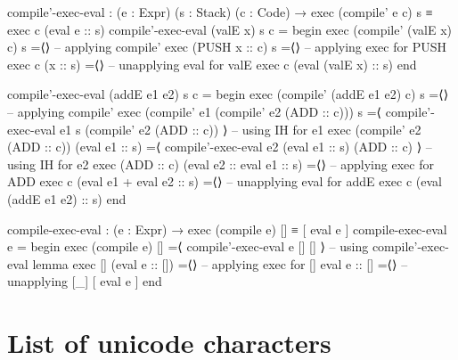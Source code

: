 \documentclass[a4paper,UKenglish]{tufte-handout}
\theoremstyle{definition}
\begin{document}
\begin{AgdaAlign}
\begin{AgdaSuppressSpace}
\begin{fullwidth}
\begin{code}[number]
compile'-exec-eval : (e : Expr) (s : Stack) (c : Code)
  → exec (compile' e c) s ≡ exec c (eval e :: s)
compile'-exec-eval (valE x) s c =
  begin
    exec (compile' (valE x) c) s
  =⟨⟩                                                    -- applying compile'
    exec (PUSH x :: c) s
  =⟨⟩                                                    -- applying exec for PUSH
    exec c (x :: s)
  =⟨⟩                                                    -- unapplying eval for valE
    exec c (eval (valE x) :: s)
  end
\end{code}

\begin{code}[number]
compile'-exec-eval (addE e1 e2) s c =
  begin
    exec (compile' (addE e1 e2) c) s
  =⟨⟩                                                    -- applying compile'
    exec (compile' e1 (compile' e2 (ADD :: c))) s
  =⟨ compile'-exec-eval e1 s (compile' e2 (ADD :: c)) ⟩  -- using IH for e1
    exec (compile' e2 (ADD :: c)) (eval e1 :: s)
  =⟨ compile'-exec-eval e2 (eval e1 :: s) (ADD :: c) ⟩   -- using IH for e2
    exec (ADD :: c) (eval e2 :: eval e1 :: s)
  =⟨⟩                                                    -- applying exec for ADD
    exec c (eval e1 + eval e2 :: s)
  =⟨⟩                                                    -- unapplying eval for addE
    exec c (eval (addE e1 e2) :: s)
  end

\end{code}

\begin{code}[number]
compile-exec-eval : (e : Expr) → exec (compile e) [] ≡ [ eval e ]
compile-exec-eval e =
  begin
    exec (compile e) [] 
  =⟨ compile'-exec-eval e [] [] ⟩                        -- using compile'-exec-eval lemma
    exec [] (eval e :: [])
  =⟨⟩                                                    -- applying exec for []
    eval e :: []
  =⟨⟩                                                    -- unapplying [_]
    [ eval e ]
  end
\end{code}
\end{fullwidth}
\end{AgdaSuppressSpace}
\end{AgdaAlign}



\appendix

\section{List of unicode characters}
\end{document}
